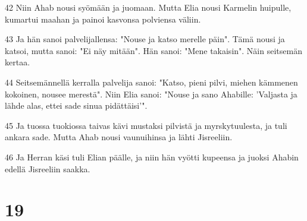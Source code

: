 \par 42 Niin Ahab nousi syömään ja juomaan. Mutta Elia nousi Karmelin huipulle, kumartui maahan ja painoi kasvonsa polviensa väliin.
\par 43 Ja hän sanoi palvelijallensa: "Nouse ja katso merelle päin". Tämä nousi ja katsoi, mutta sanoi: "Ei näy mitään". Hän sanoi: "Mene takaisin". Näin seitsemän kertaa.
\par 44 Seitsemännellä kerralla palvelija sanoi: "Katso, pieni pilvi, miehen kämmenen kokoinen, nousee merestä". Niin Elia sanoi: "Nouse ja sano Ahabille: 'Valjasta ja lähde alas, ettei sade sinua pidättäisi'".
\par 45 Ja tuossa tuokiossa taivas kävi mustaksi pilvistä ja myrskytuulesta, ja tuli ankara sade. Mutta Ahab nousi vaunuihinsa ja lähti Jisreeliin.
\par 46 Ja Herran käsi tuli Elian päälle, ja niin hän vyötti kupeensa ja juoksi Ahabin edellä Jisreeliin saakka.

\chapter{19}

